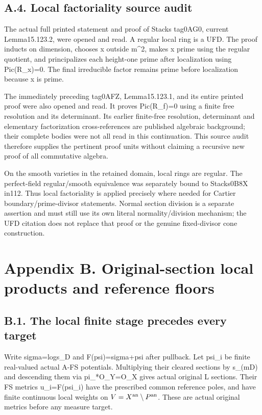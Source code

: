 \documentclass[
  10pt,
]{article}
\begin{document}
\subsection{A.4. Local factoriality source
audit}\label{a.4.-local-factoriality-source-audit}

The actual full printed statement and proof of Stacks tag0AG0, current
Lemma15.123.2, were opened and read. A regular local ring is a UFD. The
proof inducts on dimension, chooses x outside m\^{}2, makes x prime
using the regular quotient, and principalizes each height-one prime
after localization using Pic(R\_x)=0. The final irreducible factor
remains prime before localization because x is prime.

The immediately preceding tag0AFZ, Lemma15.123.1, and its entire printed
proof were also opened and read. It proves Pic(R\_f)=0 using a finite
free resolution and its determinant. Its earlier finite-free resolution,
determinant and elementary factorization cross-references are published
algebraic background; their complete bodies were not all read in this
continuation. This source audit therefore supplies the pertinent proof
units without claiming a recursive new proof of all commutative algebra.

On the smooth varieties in the retained domain, local rings are regular.
The perfect-field regular/smooth equivalence was separately bound to
Stacks0B8X in112. Thus local factoriality is applied precisely where
needed for Cartier boundary/prime-divisor statements. Normal section
division is a separate assertion and must still use its own literal
normality/division mechanism; the UFD citation does not replace that
proof or the genuine fixed-divisor cone construction.

\section{Appendix B. Original-section local products and reference
floors}\label{appendix-b.-original-section-local-products-and-reference-floors}

\subsection{B.1. The local finite stage precedes every
target}\label{b.1.-the-local-finite-stage-precedes-every-target}

Write sigma=log\textbar\textbar s\_D\textbar\textbar{} and
F(psi)=sigma+psi after pullback. Let psi\_i be finite real-valued actual
A-FS potentials. Multiplying their cleared sections by s\_(mD) and
descending them via pi\_*O\_Y=O\_X gives actual original L sections.
Their FS metrics u\_i=F(psi\_i) have the prescribed common reference
poles, and have finite continuous local weights on
\(V=X^{\rm an}\setminus P^{\rm an}\). These are actual original metrics
before any measure target.
\end{document}
